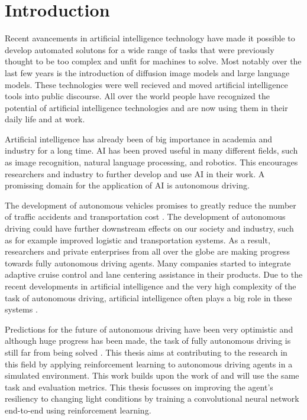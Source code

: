 \chapter{Introduction}
\label{cha:Introduction}


Recent avancements in artificial intelligence technology have made it possible to develop automated solutons for a wide range of tasks that were previously thought to be too complex and unfit for machines to solve. Most notably over the last few years is the introduction of diffusion image models and large language models. These technologies were well recieved and moved artificial intelligence tools into public discourse. All over the world people have recognized the potential of artificial intelligence technologies and are now using them in their daily life and at work.

Artificial intelligence has already been of big importance in academia and industry for a long time. AI has been proved useful in many different fields, such as image recognition, natural language processing, and robotics. This encourages researchers and industry to further develop and use AI in their work. A promissing domain for the application of AI is autonomous driving.

The development of autonomous vehicles promises to greatly reduce the number of traffic accidents and transportation cost \autocite{mckinsey}. The development of autonomous driving could have further downstream effects on our society and industry, such as for example improved logistic and transportation systems.
As a result, researchers and private enterprises from all over the globe are making progress towards fully autonomous driving agents. Many companies started to integrate adaptive cruise control and lane centering assistance \autocite{carreviews} in their products. Due to the recent developments in artificial intelligence and the very high complexity of the task of autonomous driving, artificial intelligence often plays a big role in these systems \autocite{drl_for_ad}.

Predictions for the future of autonomous driving have been very optimistic and although huge progress has been made, the task of fully autonomous driving is still far from being solved \autocite{state_of_autonomous_driving2023}. This thesis aims at contributing to the research in this field by applying reinforcement learning to autonomous driving agents in a simulated environment. This work builds upon the work of \autocite{maximilian} and will use the same task and evaluation metrics. This thesis focusses on improving the agent's resiliency to changing light conditions by training a convolutional neural network end-to-end using reinforcement learning.
